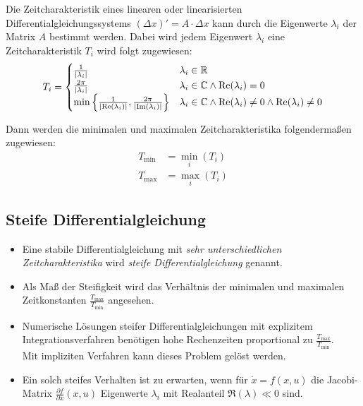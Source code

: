 			Die Zeitcharakteristik eines linearen oder linearisierten Differentialgleichungssystems \( (\Delta x)' = A \cdot \Delta x \) kann durch die Eigenwerte \( \lambda _ i \) der Matrix \(A\) bestimmt werden. Dabei wird jedem Eigenwert \(\lambda_i\) eine Zeitcharakteristik \( T_i \) wird folgt zugewiesen:
			\begin{equation*}
				T _ i =
				\begin{cases}
					\frac{1}{\abs{\lambda _ i}}                                                              & \lambda _ i \in \mathbb{R}                                                             \\
					\frac{2\pi}{\abs{\lambda _ i}}                                                           & \lambda _ i \in \mathbb{C} \land \Re(\lambda _ i) = 0                                  \\
					\min \Big\{ \frac{1}{\abs{\Re(\lambda _ i)}}, \frac{2\pi}{\abs{\Im(\lambda _ i)}} \Big\} & \lambda _ i \in \mathbb{C} \land \Re(\lambda _ i) \neq 0 \land \Re(\lambda _ i) \neq 0
				\end{cases}
			\end{equation*}

			Dann werden die minimalen und maximalen Zeitcharakteristika folgendermaßen zugewiesen:
			\begin{align*}
				T _ {\min} & = \min\limits _ i (T _ i) \\
				T _ {\max} & = \max\limits _ i (T _ i)
			\end{align*}

		\subsection{Steife Differentialgleichung} %
			\label{sec:steifedgl}

			\begin{itemize}
				\item Eine stabile Differentialgleichung mit \textit{sehr unterschiedlichen Zeitcharakteristika} wird \textit{steife Differentialgleichung} genannt.
				\item Als Maß der Steifigkeit wird das Verhältnis der minimalen und maximalen Zeitkonstanten \( \frac{T_\text{max}}{T_\text{min}} \) angesehen.
				\item Numerische Lösungen steifer Differentialgleichungen mit explizitem Integrationsverfahren benötigen hohe Rechenzeiten proportional zu \( \frac{T_\text{max}}{T_\text{min}} \). \\ Mit impliziten Verfahren kann dieses Problem gelöst werden.
				\item Ein solch steifes Verhalten ist zu erwarten, wenn für \( \dot{x} = f(x, u) \) die Jacobi-Matrix \( \frac{\partial f}{\partial x}(x, u) \) Eigenwerte \( \lambda _ i \) mit Realanteil \( \Re(\lambda) \ll 0 \) sind.
			\end{itemize}

